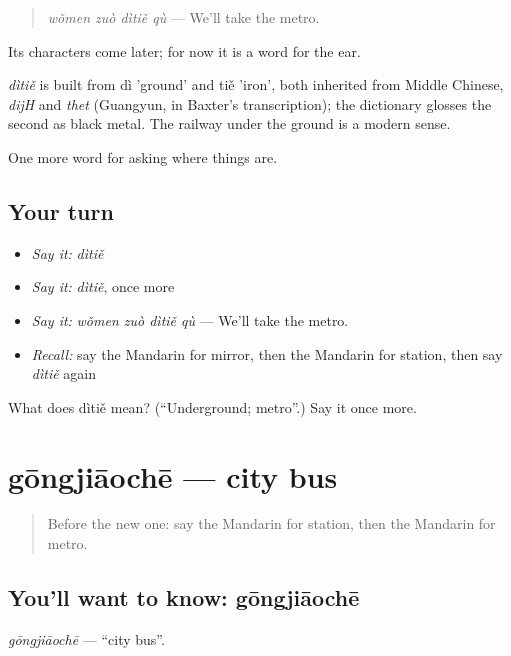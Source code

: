 \begin{quote}
\emph{wǒmen zuò dìtiě qù} — We'll take the metro.
\end{quote}

Its characters come later; for now it is a word for the ear.

\begin{cousinweb}
\emph{dìtiě} is built from dì 'ground' and tiě 'iron', both inherited from Middle Chinese, \emph{dijH} and \emph{thet} (Guangyun, in Baxter's transcription); the dictionary glosses the second as black metal. The railway under the ground is a modern sense.
\end{cousinweb}

\begin{grammarlens}[title={What you've built}]
One more word for asking where things are.
\end{grammarlens}

\subsection*{Your turn}
\begin{itemize}
\raggedright
  \item \emph{Say it:} \emph{dìtiě}
  \item \emph{Say it:} \emph{dìtiě}, once more
  \item \emph{Say it:} \emph{wǒmen zuò dìtiě qù} — We'll take the metro.
  \item \emph{Recall:} say the Mandarin for mirror, then the Mandarin for station, then say \emph{dìtiě} again
\end{itemize}

\begin{tcolorbox}[breakable,colback=teal!4,colframe=teal!35!black,title={Before you move on}]
What does dìtiě mean? (\textquotedblleft{}Underground; metro\textquotedblright{}.) Say it once more.
\end{tcolorbox}
\section[gōngjiāochē]{gōngjiāochē — city bus}

\label{lesson:ZH-C106-gongjiaoche}



\begin{quote}
Before the new one: say the Mandarin for station, then the Mandarin for metro.
\end{quote}

\subsection*{You'll want to know: gōngjiāochē}
\emph{gōngjiāochē} — \textquotedblleft{}city bus\textquotedblright{}.

